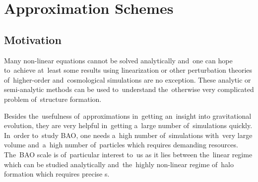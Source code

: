 \chapter{Approximation Schemes}
\label{chpt:app_schemes}

\section{Motivation}
Many non-linear equations cannot be solved analytically and~one can hope to~achieve at~least some results using linearization or other perturbation theories of~higher-order and~cosmological simulations are no exception. %
These analytic or semi-analytic methods can be used to~understand the~otherwise very complicated problem of~structure formation. %

Besides the~usefulness of~approximations in~getting an~insight into gravitational evolution, they are very helpful in~getting a~large number of~simulations quickly. In~order to~study BAO, one needs a~high number of~simulations with~very large volume and~a~high number of~particles which requires demanding resources. The~BAO scale is of~particular interest to~us as it lies between the~linear regime which can be studied analytically and~the~highly non-linear regime of~halo formation which requires precise \nbodysim s. %

